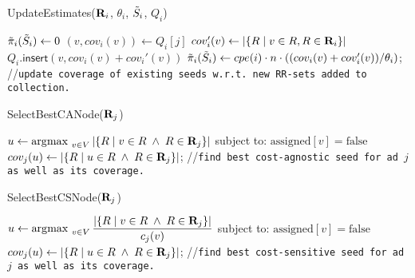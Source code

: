 \begin{algorithm}[t!]
\caption{UpdateEstimates($\mathbf{R}_i$, $\theta_i$, $\tilde{S}_i$, $Q_i$)}
\label{alg:rrUpdateEst}
\Indm
{\small
{}
}
\Indp
{ \small
$\tilde{\pi}_i(\tilde{S}_i) \gets 0 $ \;
 {
	$(v,cov_i(v)) \gets Q_i[j] $ \;
	$cov_i'(v) \gets \left\vert{\{R \mid v \in R, R \in \mathbf{R}_i\}}\right\vert $\;
	$Q_i.\mathsf{insert}(v, cov_i(v) + cov_i'(v))$\;
	$\tilde{\pi}_i(\tilde{S}_i) \gets cpe({i}) \cdot n \cdot ((cov_i(v) + cov_i'(v)) / \theta_i) $; //{\tt update coverage of existing seeds w.r.t. new RR-sets added to collection.}
}
}
\end{algorithm}

\begin{algorithm}[t!]
\caption{SelectBestCANode($\mathbf{R}_j$)}
\label{alg:rrBestCANode}
\Indm
{\small
{}
}
\Indp
{ \small
    $u \gets \operatorname*{\arg\!\max~}_{v\in V} |{\{R \mid v \in R \; \wedge \; R \in \mathbf{R}_j\}}| $
\hspace*{12ex} subject to: $\text{assigned}[v] = \text{false}$\; \label{algo-selectCA:line1}
    $cov_j(u) \gets |{\{R \mid u \in R \; \wedge \; R \in \mathbf{R}_j\}}| $;
//{\tt find best cost-agnostic seed for ad $j$ as well as its coverage.}
}
\end{algorithm}



\begin{algorithm}[t!]
\caption{SelectBestCSNode($\mathbf{R}_j$)}
\label{alg:rrBestCSNode}
\Indm
{\small
{}
}
\Indp
{ \small
    $u \gets \operatorname*{\arg\!\max~}_{v\in V} \dfrac{|{\{R \mid v \in R \; \wedge \; R \in \mathbf{R}_j\}}|}{c_j(v)} $
\hspace*{12ex} subject to: $\text{assigned}[v] = \text{false}$\; \label{algo-selectCS:line1}
    $cov_j(u) \gets |{\{R \mid u \in R \; \wedge \; R \in \mathbf{R}_j\}}| $;
//{\tt find best cost-sensitive seed for ad $j$ as well as its coverage.}
}
\end{algorithm}
\DecMargin{1em}
